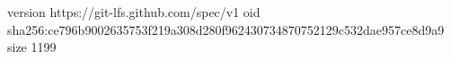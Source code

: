 version https://git-lfs.github.com/spec/v1
oid sha256:ce796b9002635753f219a308d280f962430734870752129c532dae957ce8d9a9
size 1199

